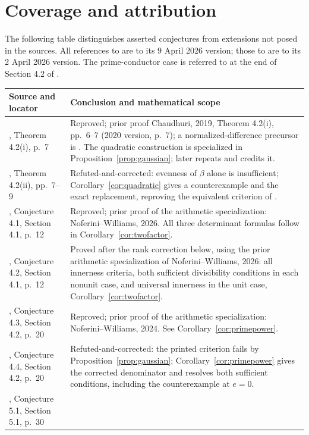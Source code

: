 \documentclass[11pt]{article}
\begin{document}
\section{Coverage and attribution}
The following table distinguishes asserted conjectures from extensions
not posed in the sources. All references to \cite{MS} are to its
9 April 2026 version; those to \cite{MSrings} are to its 2 April 2026
version. The prime-conductor case is referred to \cite{MSrings} at the
end of Section 4.2 of \cite{MS}.
\begin{small}
\begin{longtable}{@{}p{.25\linewidth}p{.70\linewidth}@{}}
\toprule Source and locator&Conclusion and mathematical scope\\\midrule
\endhead
\cite{C}, Theorem 4.2(i), p.~7 &
Reproved; prior proof Chaudhuri, 2019, Theorem 4.2(i), pp.~6--7
(2020 version, p.~7); a normalized-difference precursor is
\cite[Theorem 2.6]{Larsson}.
The quadratic construction is specialized in Proposition~\ref{prop:gaussian};
\cite[Theorems 3.2--3.4]{MSrings} later repeats and credits it.\\
\cite{C}, Theorem 4.2(ii), pp.~7--9 &
Refuted-and-corrected: evenness of $\beta$ alone is insufficient;
Corollary~\ref{cor:quadratic} gives a counterexample and the exact
replacement, reproving the equivalent criterion of
\cite[Theorem 3.5; first posted 2024]{MSrings}.\\
\cite{MS}, Conjecture 4.1, Section 4.1, p.~12 &
Reproved; prior proof of the arithmetic specialization:
Noferini--Williams, 2026. All three determinant formulas follow in
Corollary~\ref{cor:twofactor}.\\
\cite{MS}, Conjecture 4.2, Section 4.1, p.~12 &
Proved after the rank correction below, using the prior arithmetic
specialization of Noferini--Williams, 2026: all innerness criteria,
both sufficient divisibility conditions in each nonunit case, and
universal innerness in the unit case, Corollary~\ref{cor:twofactor}.\\
\cite{MS}, Conjecture 4.3, Section 4.2, p.~20 &
Reproved; prior proof of the arithmetic specialization:
Noferini--Williams, 2024. See Corollary~\ref{cor:primepower}.\\
\cite{MS}, Conjecture 4.4, Section 4.2, p.~20 &
Refuted-and-corrected: the printed criterion fails by
Proposition~\ref{prop:gaussian}; Corollary~\ref{cor:primepower} gives
the corrected denominator and resolves both sufficient conditions,
including the counterexample at $e=0$.\\
\cite{MS}, Conjecture 5.1, Section 5.1, p.~30 &

\end{longtable}
\end{small}
\end{document}
